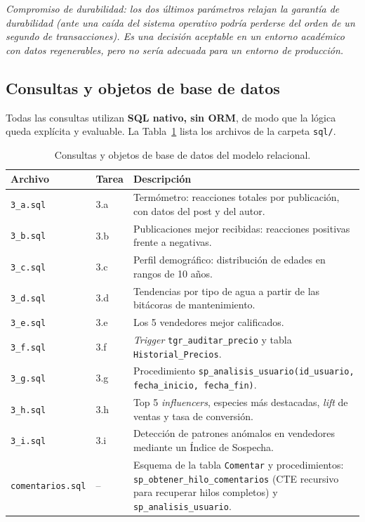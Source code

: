 \documentclass[11pt, a4paper]{article}
\newcommand{\nota}[1]{\par\smallskip\noindent\textit{\color{grisUH}#1}\par\smallskip}
\begin{document}
\nota{Compromiso de durabilidad: los dos últimos parámetros relajan la garantía de durabilidad (ante una caída del sistema operativo podría perderse del orden de un segundo de transacciones). Es una decisión aceptable en un entorno académico con datos regenerables, pero no sería adecuada para un entorno de producción.}

\subsection{Consultas y objetos de base de datos}
Todas las consultas utilizan \textbf{SQL nativo, sin ORM}, de modo que la lógica queda explícita y evaluable. La Tabla~\ref{tab:consultas} lista los archivos de la carpeta \texttt{sql/}.

\begin{table}[H]
\centering
\small
\begin{tabular}{
    >{\raggedright\arraybackslash}p{3.1cm}
    >{\raggedright\arraybackslash}p{1.1cm}
    >{\raggedright\arraybackslash}p{9.6cm}}
\toprule
\textbf{Archivo} & \textbf{Tarea} & \textbf{Descripción} \\
\midrule
\texttt{3\_a.sql} & 3.a & Termómetro: reacciones totales por publicación, con datos del post y del autor. \\
\texttt{3\_b.sql} & 3.b & Publicaciones mejor recibidas: reacciones positivas frente a negativas. \\
\texttt{3\_c.sql} & 3.c & Perfil demográfico: distribución de edades en rangos de 10 años. \\
\texttt{3\_d.sql} & 3.d & Tendencias por tipo de agua a partir de las bitácoras de mantenimiento. \\
\texttt{3\_e.sql} & 3.e & Los 5 vendedores mejor calificados. \\
\texttt{3\_f.sql} & 3.f & \textit{Trigger} \texttt{tgr\_auditar\_precio} y tabla \texttt{Historial\_Precios}. \\
\texttt{3\_g.sql} & 3.g & Procedimiento \texttt{sp\_analisis\_usuario(id\_usuario, fecha\_inicio, fecha\_fin)}. \\
\texttt{3\_h.sql} & 3.h & Top 5 \textit{influencers}, especies más destacadas, \textit{lift} de ventas y tasa de conversión. \\
\texttt{3\_i.sql} & 3.i & Detección de patrones anómalos en vendedores mediante un Índice de Sospecha. \\
\texttt{comentarios.sql} & -- & Esquema de la tabla \texttt{Comentar} y procedimientos: \texttt{sp\_obtener\_hilo\_comentarios} (CTE recursivo para recuperar hilos completos) y \texttt{sp\_analisis\_usuario}. \\
\bottomrule
\end{tabular}
\caption{Consultas y objetos de base de datos del modelo relacional.}
\label{tab:consultas}
\end{table}
\end{document}
